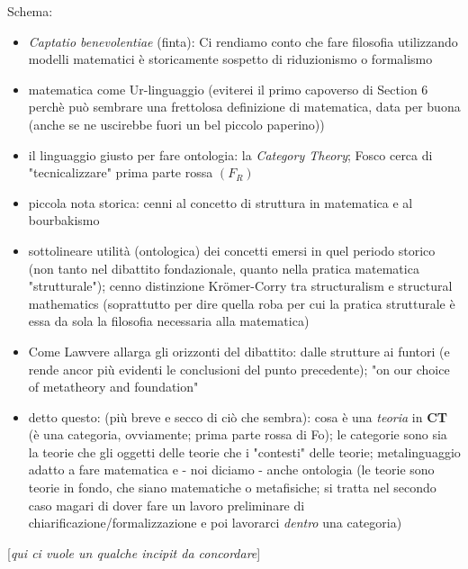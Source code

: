\documentclass[a4paper, 11pt]{article}
\begin{document}
Schema: 
\begin{itemize}
	\item \textit{Captatio benevolentiae} (finta): Ci rendiamo conto che fare filosofia utilizzando modelli matematici è storicamente sospetto di riduzionismo o formalismo
	\item matematica come Ur-linguaggio (eviterei il primo capoverso di Section 6 perchè può sembrare una frettolosa definizione di matematica, data per buona (anche se ne uscirebbe fuori un bel piccolo paperino))
	\item il linguaggio giusto per fare ontologia: la \emph{Category Theory}; Fosco cerca di "tecnicalizzare" prima parte rossa $(F_R)$ 
	\item piccola nota storica: cenni al concetto di struttura in matematica e al bourbakismo
	\item sottolineare utilità (ontologica) dei concetti emersi in quel periodo storico (non tanto nel dibattito fondazionale, quanto nella pratica matematica "strutturale"); cenno distinzione Kr\"omer-Corry tra structuralism e structural mathematics (soprattutto per dire quella roba per cui la pratica strutturale è essa da sola la filosofia necessaria alla matematica)
	\item Come Lawvere allarga gli orizzonti del dibattito: dalle strutture ai funtori (e rende ancor più evidenti le conclusioni del punto precedente); "on our choice of metatheory and foundation" 
	\item detto questo: (più breve e secco di ciò che sembra): cosa è una \emph{teoria} in \textbf{CT} (è una categoria, ovviamente; prima parte rossa di Fo); le categorie sono sia la teorie che gli oggetti delle teorie che i "contesti" delle teorie; metalinguaggio adatto a fare matematica e - noi diciamo - anche ontologia (le teorie sono teorie in fondo, che siano matematiche o metafisiche; si tratta nel secondo caso magari di dover fare un lavoro preliminare di chiarificazione/formalizzazione e poi lavorarci \emph{dentro} una categoria)
\end{itemize}

[\emph{qui ci vuole un qualche incipit da concordare}]
\end{document}
